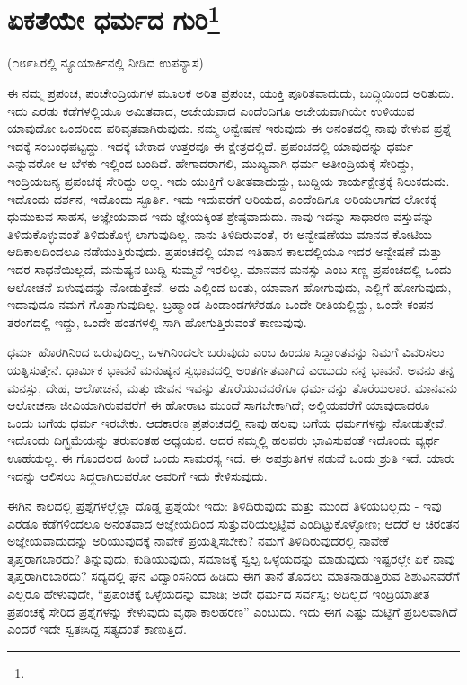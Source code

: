 
\chapter[ಏಕತೆಯೇ ಧರ್ಮದ ಗುರಿ]{ಏಕತೆಯೇ ಧರ್ಮದ ಗುರಿ\protect\footnote{}}

\begin{center}
(೧೮೯೬ರಲ್ಲಿ ನ್ಯೂಯಾರ್ಕಿನಲ್ಲಿ ನೀಡಿದ ಉಪನ್ಯಾಸ)
\end{center}

ಈ ನಮ್ಮ ಪ್ರಪಂಚ, ಪಂಚೇಂದ್ರಿಯಗಳ ಮೂಲಕ ಅರಿತ ಪ್ರಪಂಚ, ಯುಕ್ತಿ ಪೂರಿತವಾದುದು, ಬುದ್ಧಿಯಿಂದ ಅರಿತುದು. ಇದು ಎರಡು ಕಡೆಗಳಲ್ಲಿಯೂ ಅಮಿತವಾದ, ಅಜೇಯವಾದ ಎಂದೆಂದಿಗೂ ಅಜೇಯವಾಗಿಯೇ ಉಳಿಯುವ ಯಾವುದೋ ಒಂದರಿಂದ ಪರಿವೃತವಾಗಿರುವುದು. ನಮ್ಮ ಅನ್ವೇಷಣೆ ಇರುವುದು ಈ ಅನಂತದಲ್ಲಿ ನಾವು ಕೇಳುವ ಪ್ರಶ್ನೆ ಇದಕ್ಕೆ ಸಂಬಂಧಪಟ್ಟದ್ದು. ಇದಕ್ಕೆ ಬೇಕಾದ ಉತ್ತರವೂ ಈ ಕ್ಷೇತ್ರದಲ್ಲಿದೆ. ಪ್ರಪಂಚದಲ್ಲಿ ಯಾವುದನ್ನು ಧರ್ಮ ಎನ್ನುವರೋ ಆ ಬೆಳಕು ಇಲ್ಲಿಂದ ಬಂದಿದೆ. ಹೇಗಾದರಾಗಲಿ, ಮುಖ್ಯವಾಗಿ ಧರ್ಮ ಅತೀಂದ್ರಿಯಕ್ಕೆ ಸೇರಿದ್ದು, ಇಂದ್ರಿಯಜನ್ಯ ಪ್ರಪಂಚಕ್ಕೆ ಸೇರಿದ್ದು ಅಲ್ಲ. ಇದು ಯುಕ್ತಿಗೆ ಅತೀತವಾದುದ್ದು, ಬುದ್ದಿಯ ಕಾರ್ಯಕ್ಷೇತ್ರಕ್ಕೆ ನಿಲುಕದುದು. ಇದೊಂದು ದರ್ಶನ, ಇದೊಂದು ಸ್ಫೂರ್ತಿ. ಇದು ಇದುವರೆಗೆ ಅರಿಯದ, ಎಂದೆಂದಿಗೂ ಅರಿಯಲಾಗದ ಲೋಕಕ್ಕೆ ಧುಮುಕುವ ಸಾಹಸ, ಅಜ್ಞೇಯವಾದ ಇದು ಜ್ಞೇಯಕ್ಕಿಂತ ಶ್ರೇಷ್ಠವಾದುದು. ನಾವು ಇದನ್ನು ಸಾಧಾರಣ ವಸ್ತುವನ್ನು ತಿಳಿದುಕೊಳ್ಳುವಂತೆ ತಿಳಿದುಕೊಳ್ಳ ಲಾಗುವುದಿಲ್ಲ. ನಾನು ತಿಳಿದಿರುವಂತೆ, ಈ ಅನ್ವೇಷಣೆಯು ಮಾನವ ಕೋಟಿಯ ಆದಿಕಾಲದಿಂದಲೂ ನಡೆಯುತ್ತಿರುವುದು. ಪ್ರಪಂಚದಲ್ಲಿ ಯಾವ ಇತಿಹಾಸ ಕಾಲದಲ್ಲಿಯೂ ಇದರ ಅನ್ವೇಷಣೆ ಮತ್ತು ಇದರ ಸಾಧನೆಯಿಲ್ಲದೆ, ಮನುಷ್ಯನ ಬುದ್ದಿ ಸುಮ್ಮನೆ ಇರಲಿಲ್ಲ. ಮಾನವನ ಮನಸ್ಸು ಎಂಬ ಸಣ್ಣ ಪ್ರಪಂಚದಲ್ಲಿ ಒಂದು ಆಲೋಚನೆ ಏಳುವುದನ್ನು ನೋಡುತ್ತೇವೆ. ಅದು ಎಲ್ಲಿಂದ ಬಂತು, ಯಾವಾಗ ಹೋಗುವುದು, ಎಲ್ಲಿಗೆ ಹೋಗುವುದು, ಇದಾವುದೂ ನಮಗೆ ಗೊತ್ತಾಗುವುದಿಲ್ಲ. ಬ್ರಹ್ಮಾಂಡ ಪಿಂಡಾಂಡಗಳೆರಡೂ ಒಂದೇ ರೀತಿಯಲ್ಲಿದ್ದು, ಒಂದೇ ಕಂಪನ ತರಂಗದಲ್ಲಿ ಇದ್ದು, ಒಂದೇ ಹಂತಗಳಲ್ಲಿ ಸಾಗಿ ಹೋಗುತ್ತಿರುವಂತೆ ಕಾಣುವುವು.

ಧರ್ಮ ಹೊರಗಿನಿಂದ ಬರುವುದಿಲ್ಲ, ಒಳಗಿನಿಂದಲೇ ಬರುವುದು ಎಂಬ ಹಿಂದೂ ಸಿದ್ದಾಂತವನ್ನು ನಿಮಗೆ ವಿವರಿಸಲು ಯತ್ನಿಸುತ್ತೇನೆ. ಧಾರ್ಮಿಕ ಭಾವನೆ ಮನುಷ್ಯನ ಸ್ವಭಾವದಲ್ಲಿ ಅಂತರ್ಗತವಾಗಿದೆ ಎಂಬುದು ನನ್ನ ಭಾವನೆ. ಅವನು ತನ್ನ ಮನಸ್ಸು, ದೇಹ, ಆಲೋಚನೆ, ಮತ್ತು ಜೀವನ ಇವನ್ನು ತೊರೆಯುವವರೆಗೂ ಧರ್ಮವನ್ನು ತೊರೆಯಲಾರ. ಮಾನವನು ಆಲೋಚನಾ ಜೀವಿಯಾಗಿರುವವರೆಗೆ ಈ ಹೋರಾಟ ಮುಂದೆ ಸಾಗಬೇಕಾಗಿದೆ; ಅಲ್ಲಿಯವರೆಗೆ ಯಾವುದಾದರೂ ಒಂದು ಬಗೆಯ ಧರ್ಮ ಇರಬೇಕು. ಆದಕಾರಣ ಪ್ರಪಂಚದಲ್ಲಿ ನಾವು ಹಲವು ಬಗೆಯ ಧರ್ಮಗಳನ್ನು ನೋಡುತ್ತೇವೆ. ಇದೊಂದು ದಿಗ್ಭ್ರಮೆಯನ್ನು ತರುವಂತಹ ಅಧ್ಯಯನ. ಆದರೆ ನಮ್ಮಲ್ಲಿ ಹಲವರು ಭಾವಿಸುವಂತೆ ಇದೊಂದು ವ್ಯರ್ಥ ಊಹೆಯಲ್ಲ. ಈ ಗೊಂದಲದ ಹಿಂದೆ ಒಂದು ಸಾಮರಸ್ಯ ಇದೆ. ಈ ಅಪಶ್ರುತಿಗಳ ನಡುವೆ ಒಂದು ಶ್ರುತಿ ಇದೆ. ಯಾರು ಇದನ್ನು ಆಲಿಸಲು ಸಿದ್ಧರಾಗಿರುವರೋ ಅವರಿಗೆ ಇದು ಕೇಳಿಸುವುದು.

ಈಗಿನ ಕಾಲದಲ್ಲಿ ಪ್ರಶ್ನೆಗಳಲ್ಲೆಲ್ಲಾ ದೊಡ್ಡ ಪ್ರಶ್ನೆಯೇ ಇದು: ತಿಳಿದಿರುವುದು ಮತ್ತು ಮುಂದೆ ತಿಳಿಯಬಲ್ಲದು - ಇವು ಎರಡೂ ಕಡೆಗಳಿಂದಲೂ ಅನಂತವಾದ ಅಜ್ಞೇಯದಿಂದ ಸುತ್ತುವರಿಯಲ್ಪಟ್ಟಿವೆ ಎಂದಿಟ್ಟುಕೊಳ್ಳೋಣ; ಆದರೆ ಆ ಚಿರಂತನ ಅಜ್ಞೇಯವಾದುದನ್ನು ಅರಿಯುವುದಕ್ಕೆ ನಾವೇಕೆ ಪ್ರಯತ್ನಿಸಬೇಕು? ನಮಗೆ ತಿಳಿದಿರುವುದರಲ್ಲಿ ನಾವೇಕೆ ತೃಪ್ತರಾಗಬಾರದು? ತಿನ್ನುವುದು, ಕುಡಿಯುವುದು, ಸಮಾಜಕ್ಕೆ ಸ್ವಲ್ಪ ಒಳ್ಳೆಯದನ್ನು ಮಾಡುವುದು ಇಷ್ಟರಲ್ಲೇ ಏಕೆ ನಾವು ತೃಪ್ತರಾಗಿರಬಾರದು? ಸದ್ಯದಲ್ಲಿ ಘನ ವಿದ್ವಾಂಸನಿಂದ ಹಿಡಿದು ಈಗ ತಾನೆ ತೊದಲು ಮಾತನಾಡುತ್ತಿರುವ ಶಿಶುವಿನವರೆಗೆ ಎಲ್ಲರೂ ಹೇಳುವುದೇ, “ಪ್ರಪಂಚಕ್ಕೆ ಒಳ್ಳೆಯದನ್ನು ಮಾಡಿ; ಅದೇ ಧರ್ಮದ ಸರ್ವಸ್ವ; ಅದಿಲ್ಲದೆ ಇಂದ್ರಿಯಾತೀತ ಪ್ರಪಂಚಕ್ಕೆ ಸೇರಿದ ಪ್ರಶ್ನೆಗಳನ್ನು ಕೇಳುವುದು ವೃಥಾ ಕಾಲಹರಣ'' ಎಂಬುದು. ಇದು ಈಗ ಎಷ್ಟು ಮಟ್ಟಿಗೆ ಪ್ರಬಲವಾಗಿದೆ ಎಂದರೆ ಇದೇ ಸ್ವತಃಸಿದ್ದ ಸತ್ಯದಂತೆ ಕಾಣುತ್ತಿದೆ.

